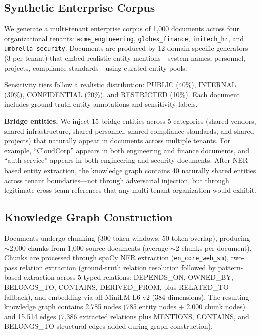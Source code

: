 \documentclass[letterpaper,twocolumn,10pt]{article}
\begin{document}
\subsection{Synthetic Enterprise Corpus}

We generate a multi-tenant enterprise corpus of 1{,}000 documents
across four organizational tenants: \texttt{acme\_engineering},
\texttt{globex\_finance}, \texttt{initech\_hr}, and
\texttt{umbrella\_security}. Documents are produced by 12
domain-specific generators (3 per tenant) that embed realistic entity
mentions---system names, personnel, projects, compliance
standards---using curated entity pools.

Sensitivity tiers follow a realistic distribution: PUBLIC (40\%),
INTERNAL (30\%), CONFIDENTIAL (20\%), and RESTRICTED (10\%). Each
document includes ground-truth entity annotations and sensitivity
labels.

\textbf{Bridge entities.} We inject 15 bridge entities across 5
categories (shared vendors, shared infrastructure, shared personnel,
shared compliance standards, and shared projects) that naturally
appear in documents across multiple tenants. For example,
``CloudCorp'' appears in both engineering and finance documents,
and ``auth-service'' appears in both engineering and security
documents. After NER-based entity extraction, the knowledge graph
contains 40 naturally shared entities across tenant boundaries---not
through adversarial injection, but through legitimate cross-team
references that any multi-tenant organization would exhibit.

\subsection{Knowledge Graph Construction}

Documents undergo chunking (300-token windows, 50-token overlap),
producing ${\sim}$2{,}000 chunks from 1{,}000 source documents
(average ${\sim}$2 chunks per document). Chunks are processed through
spaCy NER extraction (\texttt{en\_core\_web\_sm}), two-pass
relation extraction (ground-truth relation resolution followed by
pattern-based extraction across 5 typed relations: DEPENDS\_ON,
OWNED\_BY, BELONGS\_TO, CONTAINS, DERIVED\_FROM, plus RELATED\_TO
fallback), and embedding via all-MiniLM-L6-v2 (384 dimensions). The
resulting knowledge graph contains 2{,}785 nodes (785 entity nodes +
2{,}000 chunk nodes) and 15{,}514 edges (7{,}386 extracted relations
plus MENTIONS, CONTAINS, and BELONGS\_TO structural edges added during
graph construction).
\end{document}
